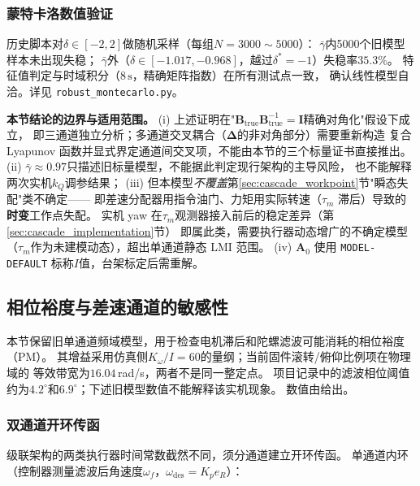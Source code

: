 \subsubsection{蒙特卡洛数值验证}

历史脚本对$\delta\in[-2,2]$做随机采样（每组$N=3000\sim5000$）：
$\bar\gamma$内5000个旧模型样本未出现失稳；
$\bar\gamma$外（$\delta\in[-1.017,-0.968]$，越过$\delta^\ast=-1$）失稳率$35.3\%$。
特征值判定与时域积分（$8\,\mathrm{s}$，精确矩阵指数）在所有测试点一致，
确认线性模型自洽。详见 \texttt{robust\_montecarlo.py}。

\begin{remark}
\textbf{本节结论的边界与适用范围。}
(i) 上述证明在"$\mathbf{B}_{\mathrm{true}}\mathbf{B}_{\mathrm{true}}^{-1}=\mathbf{I}$精确对角化"假设下成立，
即三通道独立分析；多通道交叉耦合（$\boldsymbol{\Delta}$的非对角部分）需要重新构造
复合 Lyapunov 函数并显式界定通道间交叉项，不能由本节的三个标量证书直接推出。
(ii) $\bar\gamma\approx0.97$只描述旧标量模型，不能据此判定现行架构的主导风险，
也不能解释两次实机$k_Q$调参结果；
(iii) 但本模型\emph{不覆盖}第\ref{sec:cascade_workpoint}节"瞬态失配"类不确定——
即差速分配器用指令油门、力矩用实际转速（$\tau_m$ 滞后）导致的\textbf{时变}工作点失配。
实机 yaw 在$\tau_m$观测器接入前后的稳定差异（第\ref{sec:cascade_implementation}节）
即属此类，需要执行器动态增广的不确定模型（$\tau_m$作为未建模动态），超出单通道静态 LMI 范围。
(iv) $\mathbf{A}_0$ 使用 \texttt{MODEL-DEFAULT} 标称$I$值，台架标定后需重解。
\end{remark}

\subsection{相位裕度与差速通道的敏感性}
\label{sec:cascade_pm}

本节保留旧单通道频域模型，用于检查电机滞后和陀螺滤波可能消耗的相位裕度（PM）。
其增益采用仿真侧$K_\omega/I=60$的量纲；当前固件滚转/俯仰比例项在物理域的
等效带宽为$16.04$\,rad/s，两者不是同一整定点。
项目记录中的滤波相位阈值约为$4.2^\circ$和$6.9^\circ$；下述旧模型数值不能解释该实机现象。
数值由给出。

\subsubsection{双通道开环传函}

级联架构的两类执行器时间常数截然不同，须分通道建立开环传函。
单通道内环（控制器测量滤波后角速度$\omega_f$，$\omega_{\mathrm{des}}=K_p e_R$）：

